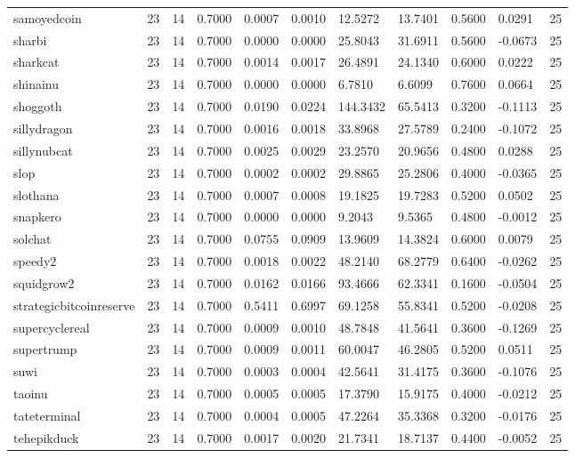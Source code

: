 \begin{table}[htbp]
\begin{tabular}{lllllllllll}
samoyedcoin & 23 & 14 & 0.7000 & 0.0007 & 0.0010 & 12.5272 & 13.7401 & 0.5600 & 0.0291 & 25 \\
sharbi & 23 & 14 & 0.7000 & 0.0000 & 0.0000 & 25.8043 & 31.6911 & 0.5600 & -0.0673 & 25 \\
sharkcat & 23 & 14 & 0.7000 & 0.0014 & 0.0017 & 26.4891 & 24.1340 & 0.6000 & 0.0222 & 25 \\
shinainu & 23 & 14 & 0.7000 & 0.0000 & 0.0000 & 6.7810 & 6.6099 & 0.7600 & 0.0664 & 25 \\
shoggoth & 23 & 14 & 0.7000 & 0.0190 & 0.0224 & 144.3432 & 65.5413 & 0.3200 & -0.1113 & 25 \\
sillydragon & 23 & 14 & 0.7000 & 0.0016 & 0.0018 & 33.8968 & 27.5789 & 0.2400 & -0.1072 & 25 \\
sillynubcat & 23 & 14 & 0.7000 & 0.0025 & 0.0029 & 23.2570 & 20.9656 & 0.4800 & 0.0288 & 25 \\
slop & 23 & 14 & 0.7000 & 0.0002 & 0.0002 & 29.8865 & 25.2806 & 0.4000 & -0.0365 & 25 \\
slothana & 23 & 14 & 0.7000 & 0.0007 & 0.0008 & 19.1825 & 19.7283 & 0.5200 & 0.0502 & 25 \\
snapkero & 23 & 14 & 0.7000 & 0.0000 & 0.0000 & 9.2043 & 9.5365 & 0.4800 & -0.0012 & 25 \\
solchat & 23 & 14 & 0.7000 & 0.0755 & 0.0909 & 13.9609 & 14.3824 & 0.6000 & 0.0079 & 25 \\
speedy2 & 23 & 14 & 0.7000 & 0.0018 & 0.0022 & 48.2140 & 68.2779 & 0.6400 & -0.0262 & 25 \\
squidgrow2 & 23 & 14 & 0.7000 & 0.0162 & 0.0166 & 93.4666 & 62.3341 & 0.1600 & -0.0504 & 25 \\
strategicbitcoinreserve & 23 & 14 & 0.7000 & 0.5411 & 0.6997 & 69.1258 & 55.8341 & 0.5200 & -0.0208 & 25 \\
supercyclereal & 23 & 14 & 0.7000 & 0.0009 & 0.0010 & 48.7848 & 41.5641 & 0.3600 & -0.1269 & 25 \\
supertrump & 23 & 14 & 0.7000 & 0.0009 & 0.0011 & 60.0047 & 46.2805 & 0.5200 & 0.0511 & 25 \\
suwi & 23 & 14 & 0.7000 & 0.0003 & 0.0004 & 42.5641 & 31.4175 & 0.3600 & -0.1076 & 25 \\
taoinu & 23 & 14 & 0.7000 & 0.0005 & 0.0005 & 17.3790 & 15.9175 & 0.4000 & -0.0212 & 25 \\
tateterminal & 23 & 14 & 0.7000 & 0.0004 & 0.0005 & 47.2264 & 35.3368 & 0.3200 & -0.0176 & 25 \\
tehepikduck & 23 & 14 & 0.7000 & 0.0017 & 0.0020 & 21.7341 & 18.7137 & 0.4400 & -0.0052 & 25 \\

\end{tabular}
\end{table}
